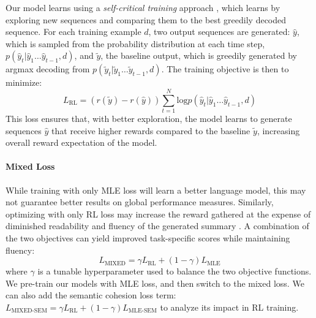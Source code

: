 \documentclass[11pt,a4paper]{article}
\begin{document}
Our model learns using a \textit{self-critical training} approach \cite{scic}, which learns by exploring new sequences and comparing them to the best greedily decoded sequence. 
For each training example $d$, two output sequences are generated: $\hat{y}$, which is sampled from the probability distribution at each time step, $p(\hat{y}_t|\hat{y}_1\dots \hat{y}_{t-1}, d)$, and $\tilde{y}$, the baseline output, which is greedily generated by argmax decoding from $p(\tilde{y}_t|\tilde{y}_1\dots \tilde{y}_{t-1}, d)$. The training objective is then to minimize: \begin{equation}
L_{\text{RL}}=\textstyle (r(\tilde{y})-r(\hat{y})) \sum_{t=1}^N \text{log} p(\hat{y}_t|\hat{y}_1\dots \hat{y}_{t-1}, d)
\label{lossrl}
\end{equation}
This loss ensures that, with better exploration, the model learns to generate sequences  $\hat{y}$ that receive higher rewards compared to the baseline $\tilde{y}$, increasing overall reward expectation of the model. 
\paragraph{Mixed Loss} 
While training with only MLE loss will learn a better language model, this may not guarantee better results on global performance measures. Similarly, optimizing with only RL loss may increase the reward gathered at the expense of diminished readability and fluency of the generated summary \cite{rlsummsocher}. A combination of the two objectives can yield improved task-specific scores while maintaining fluency:
\begin{equation}
L_{\text{MIXED}}= \gamma L_{\text{RL}}+(1-\gamma)L_{\text{MLE}}
\label{lossmixed}
\end{equation}
where $\gamma$ is a tunable hyperparameter used to balance the two objective functions. We pre-train our models with MLE loss, and then switch to the mixed loss.
We can also add the semantic cohesion loss term: $L_{\text{MIXED-SEM}} = \gamma L_{\text{RL}}+(1-\gamma)L_{\text{MLE-SEM}}$ to analyze its impact in RL training.
\end{document}
